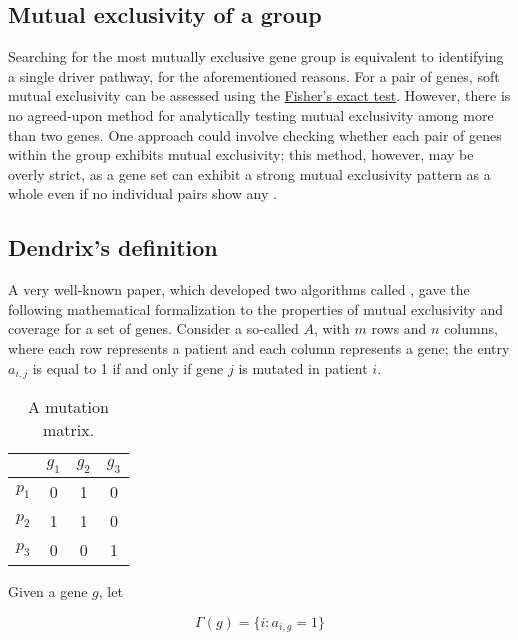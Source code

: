 \subsection{Mutual exclusivity of a group}

Searching for the most mutually exclusive gene group is equivalent to identifying a single driver pathway, for the aforementioned reasons. For a pair of genes, soft mutual exclusivity can be assessed using the \href{https://en.wikipedia.org/wiki/Fisher\%27s_exact_test}{Fisher's exact test}. However, there is no agreed-upon method for analytically testing mutual exclusivity among more than two genes. One approach could involve checking whether each pair of genes within the group exhibits mutual exclusivity; this method, however, may be overly strict, as a gene set can exhibit a strong mutual exclusivity pattern as a whole even if no individual pairs show any \cite{mutex}.

\subsection{Dendrix's definition}

A very well-known paper, which developed two algorithms called  \cite{dendrix} , gave the following mathematical formalization to the properties of mutual exclusivity and coverage for a set of genes. Consider a so-called  $A$, with $m$ rows and $n$ columns, where each row represents a patient and each column represents a gene; the entry $a_{i, j}$ is equal to 1 if and only if gene $j$ is mutated in patient $i$.

\begin{table}[H]
    \centering
    \begin{tabular}{c|ccc}
              & $g_1$ & $g_2$ & $g_3$ \\
        \hline
        $p_1$ & 0 & 1 & 0 \\
        \hline
        $p_2$ & 1 & 1 & 0 \\
        \hline
        $p_3$ & 0 & 0 & 1 \\
    \end{tabular}
    \caption{A mutation matrix.}\label{mutation_matrix}
\end{table}

Given a gene $g$, let

\begin{equation}
    \Gamma(g) = \{i : a_{i, g} = 1\}
\end{equation}


